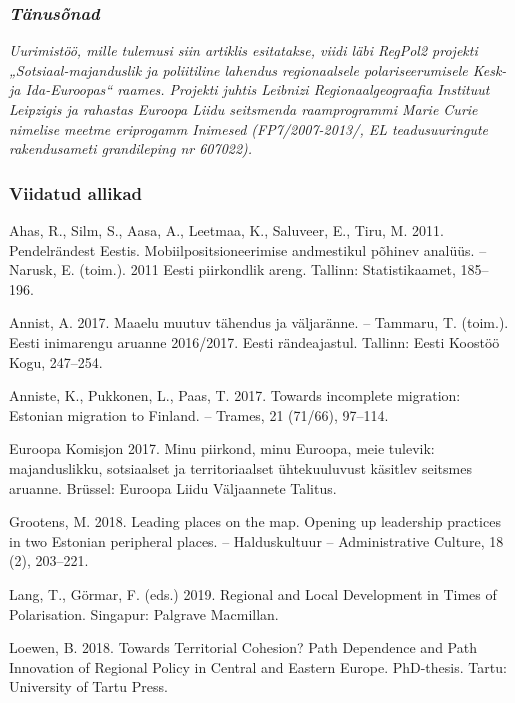 \documentclass[estonian,]{article}
\begin{document}
\hypertarget{tuxe4nusuxf5nad}{%
\subsubsection*{\texorpdfstring{\emph{Tänusõnad}}{Tänusõnad}}\label{tuxe4nusuxf5nad}}

\emph{Uurimistöö, mille tulemusi siin artiklis esitatakse, viidi läbi RegPol2 projekti „Sotsiaal-majanduslik ja poliitiline lahendus regionaalsele polariseerumisele Kesk- ja Ida-Euroopas`` raames. Projekti juhtis Leibnizi Regionaalgeograafia Instituut Leipzigis ja rahastas Euroopa Liidu seitsmenda raamprogrammi Marie Curie nimelise meetme eriprogamm Inimesed (FP7/2007-2013/, EL teadusuuringute rakendusameti grandileping nr 607022).}

\hypertarget{viidatud-allikad-2}{%
\subsubsection*{Viidatud allikad}\label{viidatud-allikad-2}}

Ahas, R., Silm, S., Aasa, A., Leetmaa, K., Saluveer, E., Tiru, M. 2011. Pendelrändest Eestis. Mobiilpositsioneerimise andmestikul põhinev analüüs. -- Narusk, E. (toim.). 2011 Eesti piirkondlik areng. Tallinn: Statistikaamet, 185--196.

Annist, A. 2017. Maaelu muutuv tähendus ja väljaränne. -- Tammaru, T. (toim.). Eesti inimarengu aruanne 2016/2017. Eesti rändeajastul. Tallinn: Eesti Koostöö Kogu, 247--254.

Anniste, K., Pukkonen, L., Paas, T. 2017. Towards incomplete migration: Estonian migration to Finland. -- Trames, 21 (71/66), 97--114.

Euroopa Komisjon 2017. Minu piirkond, minu Euroopa, meie tulevik: majanduslikku, sotsiaalset ja territoriaalset ühtekuuluvust käsitlev seitsmes aruanne. Brüssel: Euroopa Liidu Väljaannete Talitus.

Grootens, M. 2018. Leading places on the map. Opening up leadership practices in two Estonian peripheral places. -- Halduskultuur -- Administrative Culture, 18 (2), 203--221.

Lang, T., Görmar, F. (eds.) 2019. Regional and Local Development in Times of Polarisation. Singapur: Palgrave Macmillan.

Loewen, B. 2018. Towards Territorial Cohesion? Path Dependence and Path Innovation of Regional Policy in Central and Eastern Europe. PhD-thesis. Tartu: University of Tartu Press.
\end{document}
